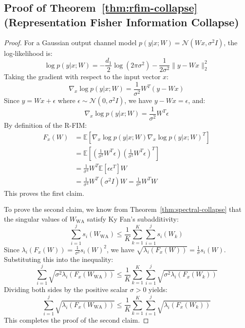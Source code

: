 \documentclass{article}
\theoremstyle{plain}
\theoremstyle{definition}
\theoremstyle{remark}
\begin{document}
\subsection{Proof of Theorem~\ref{thm:rfim-collapse} (Representation Fisher Information Collapse)}
\label{appendix:rfim-proof}
\begin{proof}
For a Gaussian output channel model $p(y|x; W) = \mathcal{N}(Wx, \sigma^2 I)$, the log-likelihood is:
\begin{equation}
    \log p(y|x; W) = -\frac{d_1}{2}\log(2\pi\sigma^2) - \frac{1}{2\sigma^2} \| y - Wx \|_2^2
\end{equation}
Taking the gradient with respect to the input vector $x$:
\begin{equation}
    \nabla_x \log p(y|x; W) = \frac{1}{\sigma^2} W^T (y - Wx)
\end{equation}
Since $y = Wx + \epsilon$ where $\epsilon \sim \mathcal{N}(0, \sigma^2 I)$, we have $y - Wx = \epsilon$, and:
\begin{equation}
    \nabla_x \log p(y|x; W) = \frac{1}{\sigma^2} W^T \epsilon
\end{equation}
By definition of the R-FIM:
\begin{align}
    F_x(W) &= \mathbb{E}\left[ \nabla_x \log p(y|x; W) \nabla_x \log p(y|x; W)^T \right] \nonumber \\
    &= \mathbb{E}\left[ \left(\frac{1}{\sigma^2} W^T \epsilon\right) \left(\frac{1}{\sigma^2} W^T \epsilon\right)^T \right] \nonumber \\
    &= \frac{1}{\sigma^4} W^T \mathbb{E}[\epsilon \epsilon^T] W \nonumber \\
    &= \frac{1}{\sigma^4} W^T (\sigma^2 I) W = \frac{1}{\sigma^2} W^T W
\end{align}
This proves the first claim.

To prove the second claim, we know from Theorem~\ref{thm:spectral-collapse} that the singular values of $W_{\text{WA}}$ satisfy Ky Fan's subadditivity:
\begin{equation}
    \sum_{i=1}^j s_i(W_{\text{WA}}) \le \frac{1}{K}\sum_{k=1}^K \sum_{i=1}^j s_i(W_k)
\end{equation}
Since $\lambda_i(F_x(W)) = \frac{1}{\sigma^2} s_i(W)^2$, we have $\sqrt{\lambda_i(F_x(W))} = \frac{1}{\sigma} s_i(W)$. Substituting this into the inequality:
\begin{equation}
    \sum_{i=1}^j \sqrt{\sigma^2 \lambda_i(F_x(W_{\text{WA}}))} \le \frac{1}{K}\sum_{k=1}^K \sum_{i=1}^j \sqrt{\sigma^2 \lambda_i(F_x(W_k))}
\end{equation}
Dividing both sides by the positive scalar $\sigma > 0$ yields:
\begin{equation}
    \sum_{i=1}^j \sqrt{\lambda_i(F_x(W_{\text{WA}}))} \le \frac{1}{K}\sum_{k=1}^K \sum_{i=1}^j \sqrt{\lambda_i(F_x(W_k))}
\end{equation}
This completes the proof of the second claim.


\end{proof}
\end{document}
